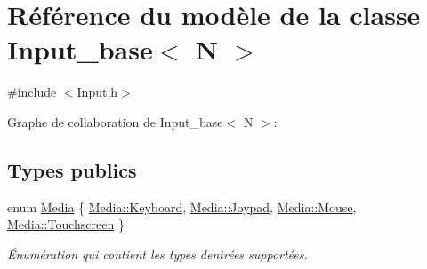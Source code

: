 \hypertarget{class_input__base}{}\section{Référence du modèle de la classe Input\+\_\+base$<$ N $>$}
\label{class_input__base}


{\ttfamily \#include $<$Input.\+h$>$}



Graphe de collaboration de Input\+\_\+base$<$ N $>$\+:
\subsection*{Types publics}
\begin{DoxyCompactItemize}
\item 
enum \hyperlink{class_input__base_a455585e7933485981b3d7bfcad3a47c6}{Media} \{ \hyperlink{class_input__base_a455585e7933485981b3d7bfcad3a47c6a6ce4d85a628a88bbdb3ac24a8e5a9c2e}{Media\+::\+Keyboard}, 
\hyperlink{class_input__base_a455585e7933485981b3d7bfcad3a47c6ad17c22e217179fc5626be9b94f1f18fa}{Media\+::\+Joypad}, 
\hyperlink{class_input__base_a455585e7933485981b3d7bfcad3a47c6af2a47c6809d88e175dade0ef7b16aa13}{Media\+::\+Mouse}, 
\hyperlink{class_input__base_a455585e7933485981b3d7bfcad3a47c6a588711541a203a16bbc517f3f73ef7c8}{Media\+::\+Touchscreen}
 \}\begin{DoxyCompactList}\small\item\em Énumération qui contient les types d\textquotesingle{}entrées supportées. \end{DoxyCompactList}
\end{DoxyCompactItemize}
